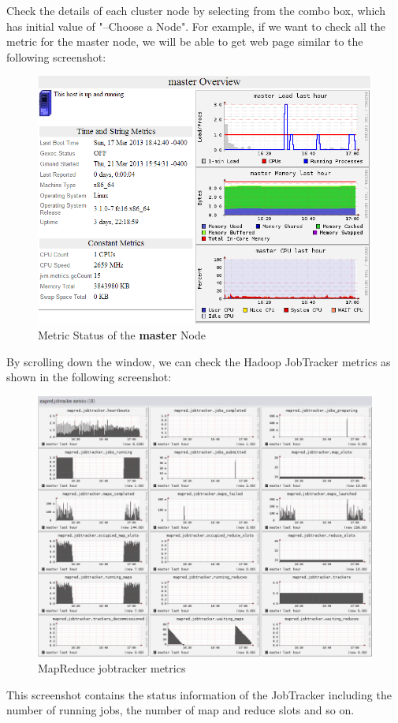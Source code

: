 Check the details of each cluster node by selecting from the combo box, which has initial value of "--Choose a Node". For example, if we want to check all the metric for the master node, we will be able to get web page similar to the following screenshot:
\begin{figure}[ht]
  \centering
  \includegraphics[width=.8\textwidth]{figs/5163os_06_11.png}
  \caption{Metric Status of the \textbf{master} Node}\label{fig:master.status}
\end{figure} 
By scrolling down the window, we can check the Hadoop JobTracker metrics as shown in the following screenshot: \\
\begin{figure}[ht]
  \centering
  \includegraphics[width=.8\textwidth]{figs/5163os_06_12.png}
  \caption{MapReduce jobtracker metrics}\label{fig:jobtracker.metrics}
\end{figure} 
This screenshot contains the status information of the JobTracker including the number of running jobs, the number of map and reduce slots and so on.


